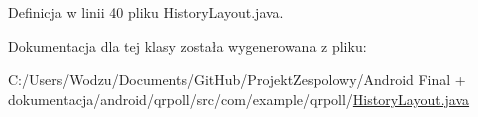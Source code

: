 Definicja w linii 40 pliku History\+Layout.\+java.



Dokumentacja dla tej klasy została wygenerowana z pliku\+:\begin{DoxyCompactItemize}
\item 
C\+:/\+Users/\+Wodzu/\+Documents/\+Git\+Hub/\+Projekt\+Zespolowy/\+Android Final + dokumentacja/android/qrpoll/src/com/example/qrpoll/\hyperlink{_history_layout_8java}{History\+Layout.\+java}\end{DoxyCompactItemize}
